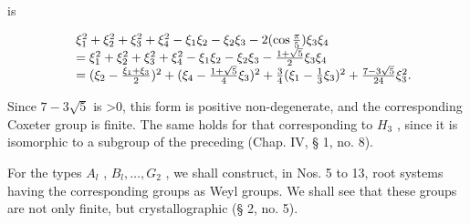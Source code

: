 is

\[
\begin{array}{r l} & \xi_ {1} ^ {2} + \xi_ {2} ^ {2} + \xi_ {3} ^ {2} + \xi_ {4} ^ {2} - \xi_ {1} \xi_ {2} - \xi_ {2} \xi_ {3} - 2 (\cos \frac {\pi}{5}) \xi_ {3} \xi_ {4} \\ & = \xi_ {1} ^ {2} + \xi_ {2} ^ {2} + \xi_ {3} ^ {2} + \xi_ {4} ^ {2} - \xi_ {1} \xi_ {2} - \xi_ {2} \xi_ {3} - \frac {1 + \sqrt {5}}{2} \xi_ {3} \xi_ {4} \\ & = (\xi_ {2} - \frac {\xi_ {1} + \xi_ {3}}{2}) ^ {2} + (\xi_ {4} - \frac {1 + \sqrt {5}}{4} \xi_ {3}) ^ {2} + \frac {3}{4} (\xi_ {1} - \frac {1}{3} \xi_ {3}) ^ {2} + \frac {7 - 3 \sqrt {5}}{24} \xi_ {3} ^ {2}. \end{array}
\]

Since \(7 - 3\sqrt{5}\) is \textgreater0, this form is positive non-degenerate, and the corresponding Coxeter group is finite. The same holds for that corresponding to \(H_{3}\) , since it is isomorphic to a subgroup of the preceding (Chap. IV, § 1, no. 8).

For the types \(A_{l}\) , \(B_{l}, \ldots, G_{2}\) , we shall construct, in Nos. 5 to 13, root systems having the corresponding groups as Weyl groups. We shall see that these groups are not only finite, but crystallographic (§ 2, no. 5).

